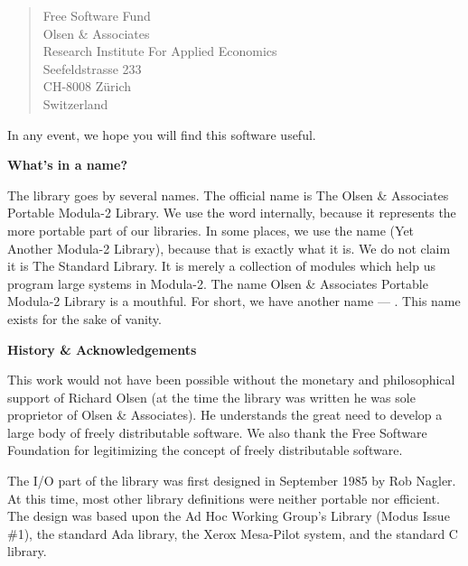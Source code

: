 \begin{quote}
Free Software Fund \\
Olsen \& Associates \\
Research Institute For Applied Economics\\
Seefeldstrasse 233 \\
CH-8008 Z\"urich \\
Switzerland \\
\end{quote}
	
In any event, we hope you will find this software useful.

\medskip
{\bf What's in a name?}


The library goes by several names.  The official name is
The Olsen \& Associates Portable Modula-2 Library.
We use the word 
internally, because it represents the more portable part of our libraries.
In some places, we use the name  (Yet Another Modula-2
Library), because that is exactly what it is.  We do not claim it is
The Standard Library.  It is merely a collection of modules which 
help us program large systems in Modula-2.  The name Olsen \& Associates
Portable Modula-2 Library is a mouthful.  For short, we have another
name --- .  This name exists for the sake of vanity.

\medskip
{\bf History \& Acknowledgements}

This work would not have been possible without the monetary and philosophical
support of Richard Olsen (at the time the library was written he was
sole proprietor of Olsen \& Associates).  He understands the great need
to develop a large body of freely distributable software.  We also thank 
the Free Software Foundation for legitimizing the concept of freely
distributable software.

The I/O part of the library was first designed in September 1985 by
Rob Nagler.  At this time, most other library definitions were neither
portable nor efficient.  The design was based upon the Ad Hoc Working Group's
Library (Modus Issue \#1), the standard Ada library, the Xerox Mesa-Pilot
system, and the standard C library.

